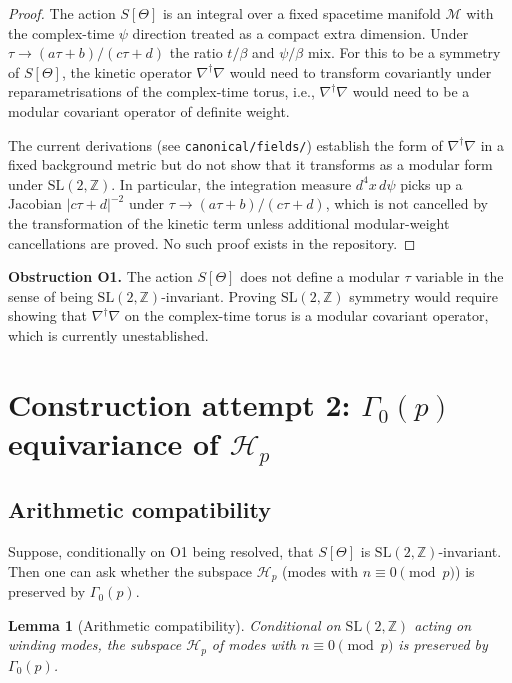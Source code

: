 \documentclass[12pt,a4paper]{article}
\newtheorem{lemma}[theorem]{Lemma}
\theoremstyle{definition}
\theoremstyle{remark}
\newcommand{\SL}{\mathrm{SL}}
\newcommand{\ZZ}{\mathbb{Z}}
\newcommand{\Gam}{\Gamma}
\newcommand{\Hp}{\mathcal{H}_p}
\begin{document}
\begin{proof}
The action $S[\Theta]$ is an integral over a fixed spacetime manifold
$\mathcal{M}$ with the complex-time $\psi$ direction treated as a compact
extra dimension.  Under $\tau\to(a\tau+b)/(c\tau+d)$ the ratio
$t/\beta$ and $\psi/\beta$ mix.  For this to be a symmetry of
$S[\Theta]$, the kinetic operator $\nabla^\dagger\nabla$ would need to
transform covariantly under reparametrisations of the complex-time torus,
i.e., $\nabla^\dagger\nabla$ would need to be a modular covariant operator
of definite weight.

The current derivations (see \texttt{canonical/fields/}) establish the
form of $\nabla^\dagger\nabla$ in a fixed background metric but do not
show that it transforms as a modular form under $\SL(2,\ZZ)$.  In
particular, the integration measure $d^4x\,d\psi$ picks up a Jacobian
$|c\tau+d|^{-2}$ under $\tau\to(a\tau+b)/(c\tau+d)$, which is not
cancelled by the transformation of the kinetic term unless additional
modular-weight cancellations are proved.  No such proof exists in the
repository.
\end{proof}

\begin{gapbox}
\textbf{Obstruction O1.} The action $S[\Theta]$ does not define a modular
$\tau$ variable in the sense of being $\SL(2,\ZZ)$-invariant.  Proving
$\SL(2,\ZZ)$ symmetry would require showing that
$\nabla^\dagger\nabla$ on the complex-time torus is a modular covariant
operator, which is currently unestablished.
\end{gapbox}

\section{Construction attempt 2: $\Gam_0(p)$ equivariance of $\Hp$}
\label{sec:gamma0}

\subsection{Arithmetic compatibility}

Suppose, conditionally on O1 being resolved, that $S[\Theta]$ is
$\SL(2,\ZZ)$-invariant.  Then one can ask whether the subspace $\Hp$
(modes with $n\equiv 0\pmod p$) is preserved by $\Gam_0(p)$.

\begin{lemma}[Arithmetic compatibility]
\label{lem:arith}
Conditional on $\SL(2,\ZZ)$ acting on winding modes, the subspace $\Hp$
of modes with $n\equiv 0\pmod{p}$ is preserved by $\Gam_0(p)$.
\end{lemma}
\end{document}
